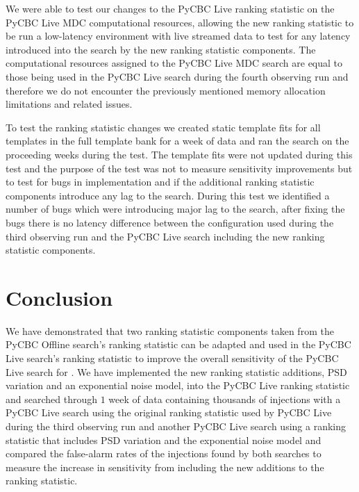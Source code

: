 We were able to test our changes to the PyCBC Live ranking statistic on the PyCBC Live MDC computational resources, allowing the new ranking statistic to be run a low-latency environment with live streamed data to test for any latency introduced into the search by the new ranking statistic components. The computational resources assigned to the PyCBC Live MDC search are equal to those being used in the PyCBC Live search during the fourth observing run and therefore we do not encounter the previously mentioned memory allocation limitations and related issues.

To test the ranking statistic changes we created static template fits for all templates in the full template bank for a week of data and ran the search on the proceeding weeks during the test. The template fits were not updated during this test and the purpose of the test was not to measure sensitivity improvements but to test for bugs in implementation and if the additional ranking statistic components introduce any lag to the search. During this test we identified a number of bugs which were introducing major lag to the search, after fixing the bugs there is no latency difference between the configuration used during the third observing run and the PyCBC Live search including the new ranking statistic components.
%
%





\section{\label{5:sec:conclusion}Conclusion}

We have demonstrated that two ranking statistic components taken from the PyCBC Offline search's ranking statistic can be adapted and used in the PyCBC Live search's ranking statistic to improve the overall sensitivity of the PyCBC Live search for \gws. We have implemented the new ranking statistic additions, PSD variation and an exponential noise model, into the PyCBC Live ranking statistic and searched through $1$ week of \gwadj data containing thousands of \gwadj injections with a PyCBC Live search using the original ranking statistic used by PyCBC Live during the third observing run and another PyCBC Live search using a ranking statistic that includes PSD variation and the exponential noise model and compared the false-alarm rates of the injections found by both searches to measure the increase in sensitivity from including the new additions to the ranking statistic. 

